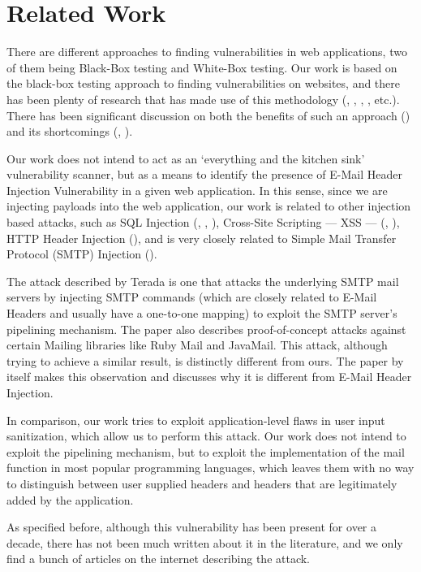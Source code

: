 \chapter{Related Work}

There are different approaches to finding vulnerabilities in web applications, two of them being Black-Box testing and White-Box testing.
Our work is based on the black-box testing approach to finding vulnerabilities on websites, and there has been plenty of research that has made use of this methodology (\cite{Beizer:1995:BTT:202699}, \cite{Huang}, \cite{kals2006secubat}, \cite{payet13:ears-in-the-wild}, \cite{zanero2005automatic} etc.). There has been significant discussion on both the benefits of such an approach (\cite{black-box}) and its shortcomings (\cite{Doupe2012}, \cite{Doupe2010}).

Our work does not intend to act as an `everything and the kitchen sink' vulnerability scanner, but as a means to identify the presence of E-Mail Header Injection Vulnerability in a given web application. In this sense, since we are injecting payloads into the web application, our work is related to other injection based attacks, such as SQL Injection (\cite{sql1}, \cite{sql0}, \cite{sql2}), Cross-Site Scripting --- XSS --- (\cite{Injection1}, \cite{KleinAmit}), HTTP Header Injection (\cite{sessionride}), and is very closely related to Simple Mail Transfer Protocol (SMTP) Injection (\cite{Terada2015}).

The attack described by Terada \cite{Terada2015} is one that attacks the underlying SMTP mail servers by injecting SMTP commands (which are closely related to E-Mail Headers and usually have a one-to-one mapping) to exploit the SMTP server's pipelining mechanism. The paper also describes proof-of-concept attacks against certain Mailing libraries like Ruby Mail and JavaMail. This attack, although trying to achieve a similar result, is distinctly different from ours. The paper by itself makes this observation and discusses why it is different from E-Mail Header Injection.

In comparison, our work tries to exploit application-level flaws in user input sanitization, which allow us to perform this attack. Our work does not intend to exploit the pipelining mechanism, but to exploit the implementation of the mail function in most popular programming languages, which leaves them with no way to distinguish between user supplied headers and headers that are legitimately added by the application.

As specified before, although this vulnerability has been present for over a decade, there has not been much written about it in the literature, and we only find a bunch of articles on the internet describing the attack.

